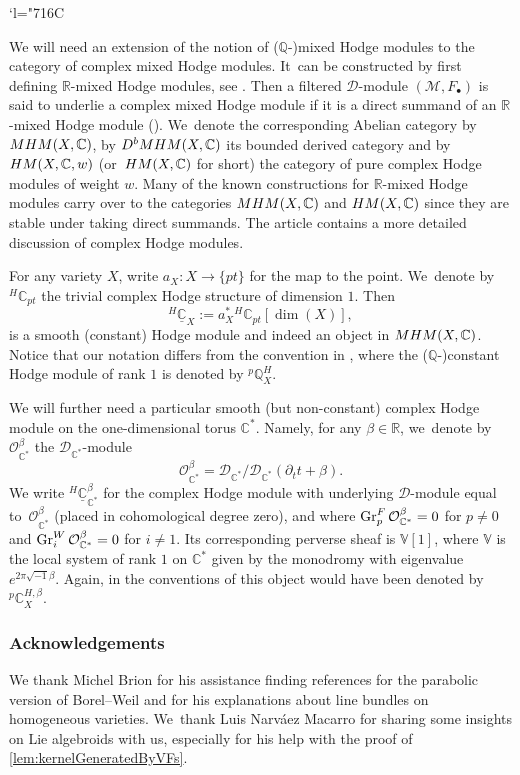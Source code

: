 \documentclass[11pt]{article}
\let\mathds\mathbb
\newcommand{\Changelback}{\mathcode`l="716C}
\newcommand{\sbullet}{{\scriptscriptstyle\bullet}}
\newcommand{\dV}{{\mathds V}}
\newcommand{\dR}{{\mathds R}}\let\R\dR
\newcommand{\dC}{{\mathds C}}\let\C\dC
\newcommand{\dQ}{{\mathds Q}}\let\Q\dQ
\newcommand{\cO}{\mathcal{O}}\let\O\cO
\DeclareMathOperator{\gr}{\textup{Gr}}
\newcommand{\MHM}{\textup{MHM}}
\newcommand{\HM}{\textup{HM}}
\begin{document}
\Changelback

We will need an extension of the notion of ($\dQ$-)mixed Hodge modules to the category of complex mixed Hodge modules. It~can be constructed by first defining $\dR$\nobreakdash-mixed Hodge modules,
see \cite[\S 13.5]{Mo12}. Then a filtered $\mathscr{D}$\nobreakdash-mod\-ule $(\mathscr{M},F_\sbullet)$ is said to underlie a complex mixed Hodge module if it is a direct summand of an $\dR$-mixed Hodge module (\cite[Def.\,3.2.1.]{DS13}). We~denote the corresponding Abelian category by $\MHM(X,\dC)$, by
$D^b\MHM(X,\dC)$ its bounded derived category and by
$\HM(X,\dC,w)$ (or~$\HM(X,\dC)$ for short) the category of pure complex Hodge modules of weight $w$. Many of the known constructions for $\dR$-mixed Hodge modules carry over to the categories $\MHM(X,\dC)$ and $\HM(X,\dC)$ since they are stable under taking direct summands.
The article \cite[\S 7.1 \& App.\,A]{VilonenDavis} contains a more detailed discussion of complex Hodge modules.

For any variety $X$, write $a_X \colon X\to \{pt\}$ for the map to the point. We~denote by
${^H\!}\dC_{pt}$ the trivial complex Hodge structure of dimension $1$. Then
\[
^{H\!}\underline{\dC}_{X} := a_X^* {^H\!}\dC_{pt}[\dim(X)],
\]
is a smooth (constant) Hodge module and indeed an object in $\MHM(X,\dC)$. Notice that our notation differs from the convention in \cite{Saito1, SaitoMHM}, where the ($\dQ$-)constant Hodge module of rank $1$ is denoted by ${^p}\dQ_X^H$.

We will further need a particular smooth (but non-constant) complex Hodge module on the one-dimensional torus $\dC^*$. Namely, for any $\beta\in \dR$, we~denote by $\cO^{\beta}_{\dC^*}$ the $\mathscr{D}_{\dC^*}$\nobreakdash-mod\-ule
\[
\cO^\beta_{\dC^*} = \mathscr{D}_{\dC^*} / \mathscr{D}_{\dC^*}(\partial_t t + \beta).
\]
We write ${^H\!}\underline{\dC}^\beta_{\dC^*}$ for the complex Hodge module with underlying $\mathscr{D}$\nobreakdash-mod\-ule equal to~$\cO^\beta_{\dC^*}$ (placed in cohomological degree zero), and where
$\gr^F_p \cO^\beta_{\dC^*} = 0$ for $p \neq 0$ and $\gr^W_i \cO^\beta_{\dC^*}= 0$ for $i \neq 1$. Its corresponding perverse sheaf
is $\dV[1]$, where $\dV$ is the local system of rank $1$ on $\dC^*$ given by the monodromy with eigenvalue $e^{2\pi \sqrt{-1} \beta}$. Again, in the conventions of \cite{Saito1, SaitoMHM} this object would have been denoted by
${^p}\dC_X^{H,\beta}$.

\subsubsection*{Acknowledgements}
We thank Michel Brion for his assistance finding references for the parabolic version of Borel--Weil and for his explanations about line bundles on homogeneous varieties. We~thank Luis Narváez Macarro for sharing some insights on Lie algebroids with us, especially for his help with the proof of \cref{lem:kernelGeneratedByVFs}.
\end{document}
